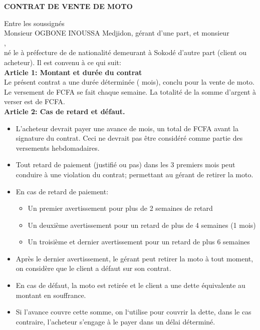 \documentclass[12pt]{article}
\begin{document}
\begin{center}
\fontsize{12}{14}\selectfont
\textbf{\MakeUppercase{Contrat de Vente de Moto}}
\end{center}

\noindent Entre les soussignés \\
Monsieur OGBONE INOUSSA Medjidon, gérant d’une part, et monsieur \\
,\\
né le  à \underline{\hspace{5cm}} préfecture de \underline{\hspace{5cm}} de nationalité \underline{\hspace{5cm}} demeurant à Sokodé d’autre part (client ou acheteur). Il est convenu à ce qui suit:\\


\textbf{Article 1: Montant et durée du contrat} \\
Le présent contrat a une durée déterminée ( mois), conclu pour la vente de moto. Le versement de \underline{\hspace{5cm}} FCFA se fait chaque semaine. La totalité de la somme d'argent à verser est de  FCFA.\\


\textbf{Article 2: Cas de retard et défaut.} 
\begin{itemize}
	\item[A.]L’acheteur devrait payer une avance de \underline{\hspace{2cm}} mois, un total de \underline{\hspace{5cm}} FCFA avant la signature du contrat. Ceci ne devrait pas être considéré comme partie des versements hebdomadaires.
	\item[B.]Tout retard de paiement (justifié ou pas) dans les 3 premiers mois peut conduire à une violation du contrat; permettant au gérant de retirer la moto. 
	\item[C.]En cas de retard de paiement: 
		\begin{itemize}
			\item[a.]Un premier avertissement pour plus de 2 semaines de retard 
			\item[b.]Un deuxième avertissement pour un retard de plus de 4 semaines (1 mois) 
			\item[c.]Un troisième et dernier avertissement pour un retard de plus 6 semaines 
		\end{itemize}
	\item[D.] Après le dernier avertissement, le gérant peut retirer la moto à tout moment, on considère que le client a défaut sur son contrat. 
	\item[E.]En cas de défaut, la moto est retirée et le client a une dette équivalente au montant en souffrance.
	\item[F.]Si l’avance couvre cette somme, on l‘utilise pour couvrir la dette, dans le cas contraire, l’acheteur s'engage à le payer dans un délai déterminé.
\end{itemize}
\end{document}
